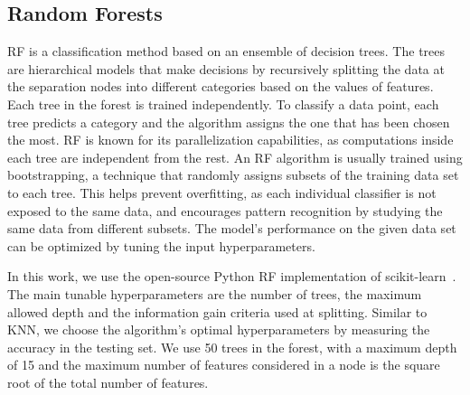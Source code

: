 \subsection*{Random Forests}

\ac{RF} is a classification method based on an ensemble of decision trees. The trees are hierarchical models that make decisions by recursively splitting the data at the separation nodes into different categories based on the values of features. Each tree in the forest is trained independently. To classify a data point, each tree predicts a category and the algorithm assigns the one that has been chosen the most. \ac{RF} is known for its parallelization capabilities, as computations inside each tree are independent from the rest. An \ac{RF} algorithm is usually trained using bootstrapping, a technique that randomly assigns subsets of the training data set to each tree. This helps prevent overfitting, as each individual classifier is not exposed to the same data, and encourages pattern recognition by studying the same data from different subsets. The model's performance on the given data set can be optimized by tuning the input hyperparameters.

In this work, we use the open-source Python \ac{RF} implementation of scikit-learn~\cite{Pedregosa:2011ork}. The main tunable hyperparameters are the number of trees, the maximum allowed depth and the information gain criteria used at splitting. Similar to \ac{KNN}, we choose the algorithm's optimal hyperparameters by measuring the accuracy in the testing set. We use 50 trees in the forest, with a maximum depth of 15 and the maximum number of features considered in a node is the square root of the total number of features.

